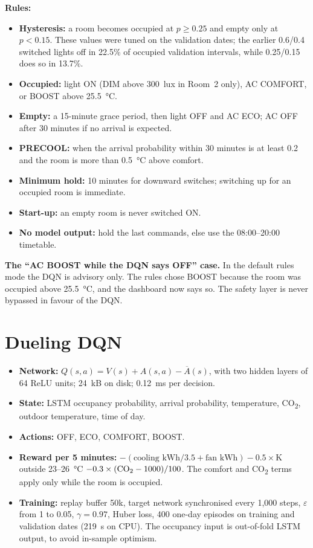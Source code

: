 \documentclass[12pt,a4paper,oneside]{report}
\newcommand{\COtwo}{CO\textsubscript{2}}
\begin{document}
\textbf{Rules:}
\begin{itemize}
\item \textbf{Hysteresis:} a room becomes occupied at $p \geq 0.25$ and empty only at $p < 0.15$. These values were
  tuned on the validation dates; the earlier 0.6/0.4 switched lights off in 22.5\% of occupied validation intervals,
  while 0.25/0.15 does so in 13.7\%.
\item \textbf{Occupied:} light ON (DIM above 300~lux in Room~2 only), AC COMFORT, or BOOST above 25.5~°C.
\item \textbf{Empty:} a 15-minute grace period, then light OFF and AC ECO; AC OFF after 30 minutes if no arrival is
  expected.
\item \textbf{PRECOOL:} when the arrival probability within 30 minutes is at least 0.2 and the room is more than
  0.5~°C above comfort.
\item \textbf{Minimum hold:} 10 minutes for downward switches; switching up for an occupied room is immediate.
\item \textbf{Start-up:} an empty room is never switched ON.
\item \textbf{No model output:} hold the last commands, else use the 08:00--20:00 timetable.
\end{itemize}

\textbf{The ``AC BOOST while the DQN says OFF'' case.} In the default rules mode the DQN is advisory only. The rules
chose BOOST because the room was occupied above 25.5~°C, and the dashboard now says so. The safety layer is never
bypassed in favour of the DQN.

\section{Dueling DQN}
\begin{itemize}
\item \textbf{Network:} $Q(s,a) = V(s) + A(s,a) - \overline{A}(s)$, with two hidden layers of 64 ReLU units; 24~kB on
  disk; 0.12~ms per decision.
\item \textbf{State:} LSTM occupancy probability, arrival probability, temperature, \COtwo{}, outdoor temperature,
  time of day.
\item \textbf{Actions:} OFF, ECO, COMFORT, BOOST.
\item \textbf{Reward per 5 minutes:} $-(\text{cooling kWh}/3.5 + \text{fan kWh}) - 0.5\times$K outside 23--26~°C
  $- 0.3\times(\text{\COtwo{}} - 1000)/100$. The comfort and \COtwo{} terms apply only while the room is occupied.
\item \textbf{Training:} replay buffer 50k, target network synchronised every 1,000 steps, $\varepsilon$ from 1 to
  0.05, $\gamma = 0.97$, Huber loss, 400 one-day episodes on training and validation dates (219~s on CPU). The
  occupancy input is out-of-fold LSTM output, to avoid in-sample optimism.
\end{itemize}
\end{document}
